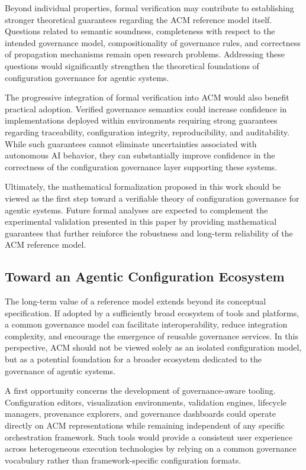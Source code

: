 \documentclass[10pt]{article}
\begin{document}
Beyond individual properties, formal verification may contribute to establishing stronger theoretical guarantees regarding the ACM reference model itself. Questions related to semantic soundness, completeness with respect to the intended governance model, compositionality of governance rules, and correctness of propagation mechanisms remain open research problems. Addressing these questions would significantly strengthen the theoretical foundations of configuration governance for agentic systems.

The progressive integration of formal verification into ACM would also benefit practical adoption. Verified governance semantics could increase confidence in implementations deployed within environments requiring strong guarantees regarding traceability, configuration integrity, reproducibility, and auditability. While such guarantees cannot eliminate uncertainties associated with autonomous AI behavior, they can substantially improve confidence in the correctness of the configuration governance layer supporting these systems.

Ultimately, the mathematical formalization proposed in this work should be viewed as the first step toward a verifiable theory of configuration governance for agentic systems. Future formal analyses are expected to complement the experimental validation presented in this paper by providing mathematical guarantees that further reinforce the robustness and long-term reliability of the ACM reference model.

\subsection{Toward an Agentic Configuration Ecosystem}

The long-term value of a reference model extends beyond its conceptual specification. If adopted by a sufficiently broad ecosystem of tools and platforms, a common governance model can facilitate interoperability, reduce integration complexity, and encourage the emergence of reusable governance services. In this perspective, ACM should not be viewed solely as an isolated configuration model, but as a potential foundation for a broader ecosystem dedicated to the governance of agentic systems.

A first opportunity concerns the development of governance-aware tooling. Configuration editors, visualization environments, validation engines, lifecycle managers, provenance explorers, and governance dashboards could operate directly on ACM representations while remaining independent of any specific orchestration framework. Such tools would provide a consistent user experience across heterogeneous execution technologies by relying on a common governance vocabulary rather than framework-specific configuration formats.
\end{document}

